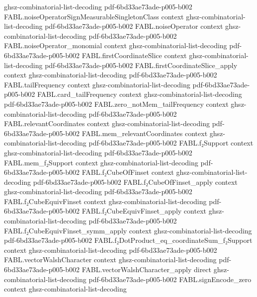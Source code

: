 \begin{theorem}
  {ghsz-combinatorial-list-decoding}
  {pdf-6bd33ae73ade-p005-b002}
\proofstep
  {FABL.noiseOperatorSignMeasurableSingletonClass}
  {context}
  {ghsz-combinatorial-list-decoding}
  {pdf-6bd33ae73ade-p005-b002}
\proofstep
  {FABL.noiseOperator}
  {context}
  {ghsz-combinatorial-list-decoding}
  {pdf-6bd33ae73ade-p005-b002}
\proofstep
  {FABL.noiseOperator_monomial}
  {context}
  {ghsz-combinatorial-list-decoding}
  {pdf-6bd33ae73ade-p005-b002}
\proofstep
  {FABL.firstCoordinateSlice}
  {context}
  {ghsz-combinatorial-list-decoding}
  {pdf-6bd33ae73ade-p005-b002}
\proofstep
  {FABL.firstCoordinateSlice_apply}
  {context}
  {ghsz-combinatorial-list-decoding}
  {pdf-6bd33ae73ade-p005-b002}
\proofstep
  {FABL.tailFrequency}
  {context}
  {ghsz-combinatorial-list-decoding}
  {pdf-6bd33ae73ade-p005-b002}
\proofstep
  {FABL.card_tailFrequency}
  {context}
  {ghsz-combinatorial-list-decoding}
  {pdf-6bd33ae73ade-p005-b002}
\proofstep
  {FABL.zero_notMem_tailFrequency}
  {context}
  {ghsz-combinatorial-list-decoding}
  {pdf-6bd33ae73ade-p005-b002}
\proofstep
  {FABL.relevantCoordinates}
  {context}
  {ghsz-combinatorial-list-decoding}
  {pdf-6bd33ae73ade-p005-b002}
\proofstep
  {FABL.mem_relevantCoordinates}
  {context}
  {ghsz-combinatorial-list-decoding}
  {pdf-6bd33ae73ade-p005-b002}
\proofstep
  {FABL.f₂Support}
  {context}
  {ghsz-combinatorial-list-decoding}
  {pdf-6bd33ae73ade-p005-b002}
\proofstep
  {FABL.mem_f₂Support}
  {context}
  {ghsz-combinatorial-list-decoding}
  {pdf-6bd33ae73ade-p005-b002}
\proofstep
  {FABL.f₂CubeOfFinset}
  {context}
  {ghsz-combinatorial-list-decoding}
  {pdf-6bd33ae73ade-p005-b002}
\proofstep
  {FABL.f₂CubeOfFinset_apply}
  {context}
  {ghsz-combinatorial-list-decoding}
  {pdf-6bd33ae73ade-p005-b002}
\proofstep
  {FABL.f₂CubeEquivFinset}
  {context}
  {ghsz-combinatorial-list-decoding}
  {pdf-6bd33ae73ade-p005-b002}
\proofstep
  {FABL.f₂CubeEquivFinset_apply}
  {context}
  {ghsz-combinatorial-list-decoding}
  {pdf-6bd33ae73ade-p005-b002}
\proofstep
  {FABL.f₂CubeEquivFinset_symm_apply}
  {context}
  {ghsz-combinatorial-list-decoding}
  {pdf-6bd33ae73ade-p005-b002}
\proofstep
  {FABL.f₂DotProduct_eq_coordinateSum_f₂Support}
  {context}
  {ghsz-combinatorial-list-decoding}
  {pdf-6bd33ae73ade-p005-b002}
\proofstep
  {FABL.vectorWalshCharacter}
  {context}
  {ghsz-combinatorial-list-decoding}
  {pdf-6bd33ae73ade-p005-b002}
\proofstep
  {FABL.vectorWalshCharacter_apply}
  {direct}
  {ghsz-combinatorial-list-decoding}
  {pdf-6bd33ae73ade-p005-b002}
\proofstep
  {FABL.signEncode_zero}
  {context}
  {ghsz-combinatorial-list-decoding}

\end{theorem}
